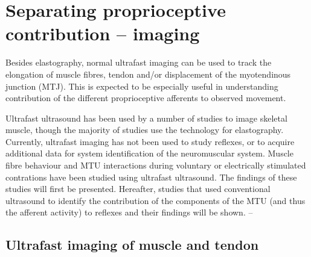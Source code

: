 \section{Separating proprioceptive contribution -- imaging}
Besides elastography, normal ultrafast imaging can be used to track the elongation of muscle fibres, tendon and/or displacement of the myotendinous junction (MTJ). This is expected to be especially useful in understanding contribution of the different proprioceptive afferents to observed movement. 

Ultrafast ultrasound has been used by a number of studies to image skeletal muscle, though the majority of studies use the technology for elastography. Currently, ultrafast imaging has not been used to study reflexes, or to acquire additional data for system identification of the neuromuscular system. Muscle fibre behaviour and MTU interactions during voluntary or electrically stimulated contrations have been studied using ultrafast ultrasound. The findings of these studies will first be presented. 
Hereafter, studies that used conventional ultrasound to identify the contribution of the components of the MTU (and thus the afferent activity) to reflexes and their findings will be shown.  -- %


\subsection{Ultrafast imaging of muscle and tendon}
\label{sec:ufus_muscle_tendon}

